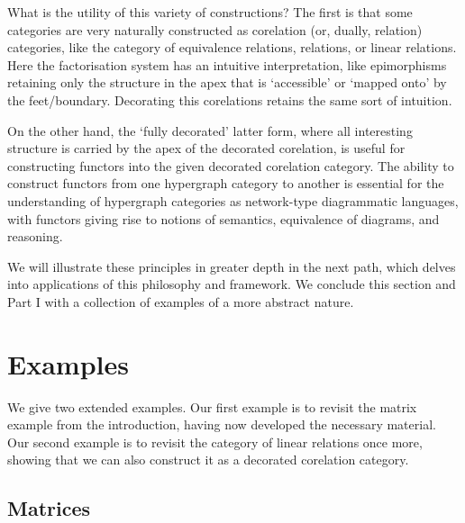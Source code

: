 What is the utility of this variety of constructions? The first is that some
categories are very naturally constructed as corelation (or, dually, relation)
categories, like the category of equivalence relations, relations, or linear
relations. Here the factorisation system has an intuitive interpretation, like
epimorphisms retaining only the structure in the apex that is `accessible' or
`mapped onto' by the feet/boundary. Decorating this corelations retains the same
sort of intuition.

On the other hand, the `fully decorated' latter form, where all interesting
structure is carried by the apex of the decorated corelation, is useful for
constructing functors into the given decorated corelation category. The ability
to construct functors from one hypergraph category to another is essential for
the understanding of hypergraph categories as network-type diagrammatic
languages, with functors giving rise to notions of semantics, equivalence of
diagrams, and reasoning.

We will illustrate these principles in greater depth in the next path, which
delves into applications of this philosophy and framework. We conclude this
section and Part I with a collection of examples of a more abstract nature.



\section{Examples} \label{sec:excor}
We give two extended examples. Our first example is to revisit the matrix
example from the introduction, having now developed the necessary material. Our
second example is to revisit the category of linear relations once more, showing
that we can also construct it as a decorated corelation category. 

\subsection{Matrices}

